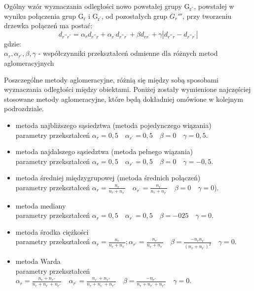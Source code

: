 \documentclass[12pt,a4paper]{report}
\begin{document}
Ogólny wzór wyznaczania odległości nowo powstałej grupy $\mathrm{G_{r^{''}}}$, powstałej w wyniku połączenia grup $\mathrm{G_{r}}$ i $\mathrm{G_{r^{'}}}$, od pozostałych grup ${G_r{'''}}$, przy tworzeniu drzewka połączeń ma postać:
\begin{equation}
d_{r^{'''}r^{''}}=\alpha_{r}d_{r^{'''}r} + \alpha_{r^{'}}d_{r^{'''}r^{'}} + \beta d_{rr^{'}} + \gamma|d_{r^{'''}r} - d_{r^{'''}r^{'}}| 
\end{equation}
gdzie:\\
$\alpha_{r},\alpha_{r^{'}}, \beta, \gamma$ - współczynniki przekształceń odmienne dla różnych metod aglomeracyjnych

Poszczególne metody aglomeracyjne, różnią się między sobą sposobami wyznaczania odległości między obiektami. Poniżej zostały wymienione najczęściej stosowane metody aglomeracyjne, które będą dokładniej omówione w kolejnym podrozdziale.
\begin{itemize}
\item metoda najbliższego sąsiedztwa (metoda pojedynczego wiązania) \\
parametry  przekształceń $\alpha_{r}=0,5 \quad \alpha_{r^{'}}=0,5 \quad  \beta=0 \quad \gamma=0,5$.
\item metoda najdalszego sąsiedztwa (metoda pełnego wiązania)\\
parametry  przekształceń $\alpha_{r}=0,5 \quad \alpha_{r^{'}}=0,5 \quad \beta=0 \quad \gamma=-0,5$.
\item metoda średniej międzygrupowej (metoda średnich połączeń)\\
parametry  przekształceń $\alpha_{r}=\frac{n_{r}}{n_{r} + n_{r^{'}}} \quad \alpha_{r^{'}}=\frac{n_{r^{'}}}{n_{r} + n_{r^{'}}} \quad \beta=0 \quad \gamma=0$).
\item metoda mediany\\
parametry  przekształceń $\alpha_{r}=0,5 \quad \alpha_{r^{'}}=0,5 \quad \beta=-025 \quad \gamma=0$.
\item metoda środka ciężkości\\
parametry  przekształceń $\alpha_{r}=\frac{n_{r}}{n_{r} + n_{r^{'}}}; \alpha_{r^{'}}=\frac{n_{r^{'}}}{n_{r} + n_{r^{'}}} \quad \beta=\frac{-n_{r}n_{r^{'}}}{(n_{r} + n_{r^{'}})^{2}} \quad \gamma=0$.
\item metoda Warda\\
parametry  przekształceń $\alpha_{r}=\frac{n_{r}+n_{r^{'''}}}{n_{r} + n_{r^{'}}+n_{r^{'''}}} \quad \alpha_{r^{'}}=\frac{n_{r^{'}}+n_{r^{'''}}}{n_{r} + n_{r^{'}}+n_{r^{'''}}} \quad \beta=\frac{-n_{r^{'''}}}{n_{r} + n_{r^{'}}+n_{r^{'''}}} \quad \gamma=0$.

\end{itemize}
 
\end{document}

